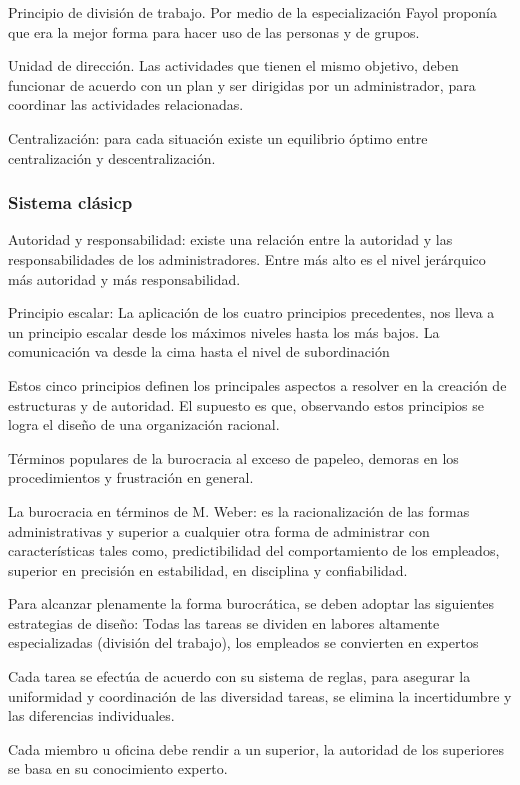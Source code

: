 Principio de división de trabajo. Por medio de la especialización Fayol proponía que era la mejor forma para hacer uso de las personas y de grupos. 

Unidad de dirección. Las actividades que tienen el mismo objetivo, deben funcionar de acuerdo con un plan y ser dirigidas por un administrador, para coordinar las actividades relacionadas.

Centralización: para cada situación existe un equilibrio óptimo entre centralización y descentralización.
\subsubsection{Sistema clásicp}
Autoridad y responsabilidad: existe una relación entre la autoridad y las responsabilidades de los administradores. Entre más alto es el nivel jerárquico más autoridad y más responsabilidad.

Principio escalar: La aplicación de los cuatro principios precedentes, nos lleva a un principio escalar desde los máximos niveles hasta los más bajos. La comunicación va desde la cima hasta el nivel de subordinación

Estos cinco principios definen los principales aspectos a resolver en la creación de estructuras y de autoridad. El supuesto es que, observando estos principios se logra el diseño de una organización racional.

Términos populares de la burocracia al exceso de papeleo, demoras en los procedimientos y frustración en general.

La burocracia en términos de M. Weber: es la racionalización de las formas administrativas y superior a cualquier otra forma de administrar con características tales como, predictibilidad del comportamiento de los empleados, superior en precisión en estabilidad, en disciplina y confiabilidad.

Para alcanzar plenamente la forma burocrática, se deben adoptar las siguientes estrategias de diseño: Todas las tareas se dividen en labores altamente especializadas (división del trabajo), los empleados se convierten en expertos

Cada tarea se efectúa de acuerdo con su sistema de reglas, para asegurar la uniformidad y coordinación de las diversidad tareas, se elimina la incertidumbre y las diferencias individuales.

Cada miembro u oficina debe rendir a un superior, la autoridad de los superiores se basa en su conocimiento experto.

